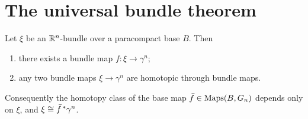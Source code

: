 \section{The universal bundle theorem}

\begin{theorem}\label{thm:universal}
Let $\xi$ be an $\mathbb{R}^n$-bundle over a paracompact base $B$. Then

\begin{enumerate}
\item there exists a bundle map $f\colon\xi\to\gamma^n$;
\item any two bundle maps $\xi\to\gamma^n$ are homotopic through bundle maps.
\end{enumerate}

Consequently the homotopy class of the base map
$\bar f\in\operatorname{Maps}(B,G_n)$ depends only on $\xi$, and $\xi\cong\bar f^{\,*}\gamma^n$.
\end{theorem}


